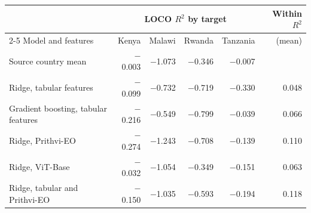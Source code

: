 \begin{tabular}{@{}lrrrrr@{}}
\toprule
 & \multicolumn{4}{c}{LOCO $R^2$ by target} & Within $R^2$ \\
\cmidrule(lr){2-5}
Model and features & Kenya & Malawi & Rwanda & Tanzania & (mean) \\
\midrule
Source country mean & $-$0.003 & $-$1.073 & $-$0.346 & $-$0.007 &  \\
Ridge, tabular features & $-$0.099 & $-$0.732 & $-$0.719 & $-$0.330 & 0.048 \\
Gradient boosting, tabular features & $-$0.216 & $-$0.549 & $-$0.799 & $-$0.039 & 0.066 \\
Ridge, Prithvi-EO & $-$0.274 & $-$1.243 & $-$0.708 & $-$0.139 & 0.110 \\
Ridge, ViT-Base & $-$0.032 & $-$1.054 & $-$0.349 & $-$0.151 & 0.063 \\
Ridge, tabular and Prithvi-EO & $-$0.150 & $-$1.035 & $-$0.593 & $-$0.194 & 0.118 \\
\bottomrule
\end{tabular}
